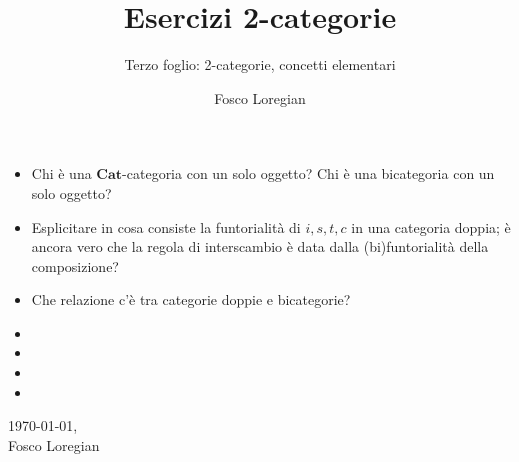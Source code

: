 \documentclass{amsart}
\title{Esercizi 2-categorie}
\subtitle{Terzo foglio: 2-categorie, concetti elementari}
\author{Fosco Loregian}
\def\Cat{\mathbf{Cat}}
\begin{document}
\maketitle
\begin{itemize}
\item Chi è una $\Cat$-categoria con un solo oggetto? Chi è una bicategoria con un solo oggetto?
\item Esplicitare in cosa consiste la funtorialità di $i,s,t,c$ in una categoria doppia; è ancora vero che la regola di interscambio è data dalla (bi)funtorialità della composizione?
\item Che relazione c'è tra categorie doppie e bicategorie?
\item 
\item 
\item 
\item 
\end{itemize}

\vspace{\fill}
\begin{flushright}
\today,\\
Fosco Loregian
\end{flushright}
\end{document}
